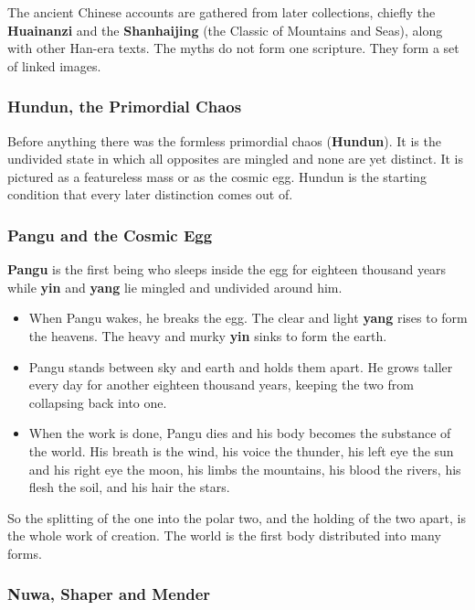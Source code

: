 The ancient Chinese accounts are gathered from later collections, chiefly the \textbf{Huainanzi} and the \textbf{Shanhaijing} (the Classic of Mountains and Seas), along with other Han-era texts. The myths do not form one scripture. They form a set of linked images.

\subsubsection{Hundun, the Primordial Chaos}

Before anything there was the formless primordial chaos (\textbf{Hundun}). It is the undivided state in which all opposites are mingled and none are yet distinct. It is pictured as a featureless mass or as the cosmic egg. Hundun is the starting condition that every later distinction comes out of.

\subsubsection{Pangu and the Cosmic Egg}

\textbf{Pangu} is the first being who sleeps inside the egg for eighteen thousand years while \textbf{yin} and \textbf{yang} lie mingled and undivided around him.

\begin{itemize}
 \item When Pangu wakes, he breaks the egg. The clear and light \textbf{yang} rises to form the heavens. The heavy and murky \textbf{yin} sinks to form the earth.
 \item Pangu stands between sky and earth and holds them apart. He grows taller every day for another eighteen thousand years, keeping the two from collapsing back into one.
 \item When the work is done, Pangu dies and his body becomes the substance of the world. His breath is the wind, his voice the thunder, his left eye the sun and his right eye the moon, his limbs the mountains, his blood the rivers, his flesh the soil, and his hair the stars.
\end{itemize}

So the splitting of the one into the polar two, and the holding of the two apart, is the whole work of creation. The world is the first body distributed into many forms.

\subsubsection{Nuwa, Shaper and Mender}

